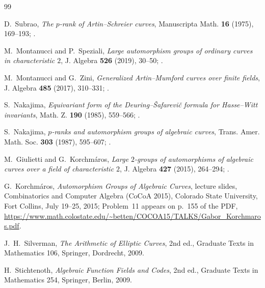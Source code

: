 \begin{thebibliography}{99}

D.~Subrao,
\emph{The $p$-rank of Artin--Schreier curves},
Manuscripta Math. \textbf{16} (1975), 169--193;
.

M.~Montanucci and P.~Speziali,
\emph{Large automorphism groups of ordinary curves in characteristic $2$},
J. Algebra \textbf{526} (2019), 30--50;
.

M.~Montanucci and G.~Zini,
\emph{Generalized Artin--Mumford curves over finite fields},
J. Algebra \textbf{485} (2017), 310--331;
.

S.~Nakajima,
\emph{Equivariant form of the Deuring--{\v S}afarevi{\v c} formula for Hasse--Witt invariants},
Math. Z. \textbf{190} (1985), 559--566;
.

S.~Nakajima,
\emph{$p$-ranks and automorphism groups of algebraic curves},
Trans. Amer. Math. Soc. \textbf{303} (1987), 595--607;
.

M.~Giulietti and G.~Korchm\'aros,
\emph{Large $2$-groups of automorphisms of algebraic curves over a field of characteristic $2$},
J. Algebra \textbf{427} (2015), 264--294;
.

G.~Korchm\'aros,
\emph{Automorphism Groups of Algebraic Curves},
lecture slides, Combinatorics and Computer Algebra (CoCoA 2015),
Colorado State University, Fort Collins, July 19--25, 2015;
Problem~11 appears on p.~155 of the PDF,
\url{https://www.math.colostate.edu/~betten/COCOA15/TALKS/Gabor_Korchmaros.pdf}.

J.~H.~Silverman,
\emph{The Arithmetic of Elliptic Curves},
2nd ed., Graduate Texts in Mathematics 106, Springer, Dordrecht, 2009.

H.~Stichtenoth,
\emph{Algebraic Function Fields and Codes},
2nd ed., Graduate Texts in Mathematics 254, Springer, Berlin, 2009.

\end{thebibliography}
